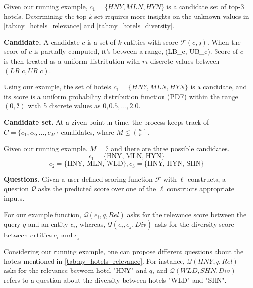 Given our running example, 
 $c_1 = \{ HNY, MLN, HYN \}$ is a candidate set of top-$3$ hotels. Determining the top-$k$ set requires more insights on the unknown values in \autoref{tab:ny_hotels_relevance} and \autoref{tab:ny_hotels_diversity}.

\noindent \textbf{Candidate.} A candidate $c$ is a set of $k$ entities with score $\mathcal{F}(c,q)$. When the score of $c$ is partially computed, it's between a range, (LB\_c, UB\_c). Score of $c$ is then treated as a uniform distribution with $m$ discrete values between $(LB\_c, UB\_c)$.

Using our example, the set of hotels $c_1=\{ HNY, MLN, HYN \}$ is a candidate, and its score is a uniform probability distribution function (PDF) within the range $(0, 2)$ with 5 discrete values as $0, 0.5, ..., 2.0$.  

\noindent \textbf{Candidate set.} At a given point in time, the process keeps track of $C=\{c_1, c_2, \ldots, c_M\}$ candidates, where $M \leq \binom{n}{k}$. 

Given our running example, $M=3$ and there are three possible candidates, \[
    c_1 = \{\text{HNY, MLN, HYN}\} \]
 \[
    c_2 = \{\text{HNY, MLN, WLD}\},c_3 = \{\text{HNY, HYN, SHN}\}
\]

\noindent \textbf{Questions.} Given a user-defined scoring function $\mathcal{F}$ with $\ell$ constructs, a question $\mathcal{Q}$ asks the predicted score over one of the $\ell$ constructs appropriate inputs.

For our example function, $\mathcal{Q}(e_i,q,Rel)$ asks for the relevance score between the query $q$ and an entity $e_i$, whereas, $\mathcal{Q}(e_i,e_j,Div)$ asks for the diversity score between entities $e_i$ and $e_j$.
 

Considering our running example, one can propose different questions about the hotels mentioned in \autoref{tab:ny_hotels_relevance}. For instance, $\mathcal{Q}(HNY,q,Rel)$ asks for the relevance between  hotel "HNY" and $q$, and $\mathcal{Q}(WLD,SHN,Div)$ refers to a question about the diversity between hotels "WLD" and "SHN".

